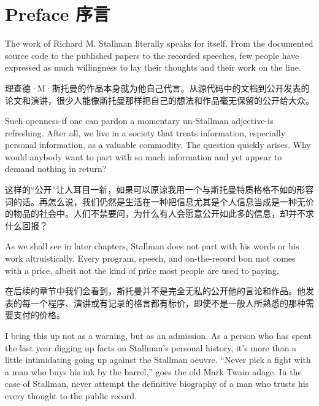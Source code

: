 \chapter{\ifdefined\eng
Preface
\fi
\ifdefined\chs
序言
\fi}

\ifdefined\eng
The work of Richard M. Stallman literally speaks for itself. From the documented source code to the published papers to the recorded speeches, few people have expressed as much willingness to lay their thoughts and their work on the line.
\fi

\ifdefined\chs
理查德·M·斯托曼的作品本身就为他自己代言。从源代码中的文档到公开发表的论文和演讲，很少人能像斯托曼那样把自己的想法和作品毫无保留的公开给大众。
\fi

\ifdefined\eng
Such openness-if one can pardon a momentary un-Stallman adjective-is refreshing. After all, we live in a society that treats information, especially personal information, as a valuable commodity. The question quickly arises. Why would anybody want to part with so much information and yet appear to demand nothing in return?
\fi

\ifdefined\chs
这样的``公开''让人耳目一新，如果可以原谅我用一个与斯托曼特质格格不如的形容词的话。再怎么说，我们仍然是生活在一种把信息尤其是个人信息当成是一种无价的物品的社会中。人们不禁要问，为什么有人会愿意公开如此多的信息，却并不求什么回报？
\fi

\ifdefined\eng
As we shall see in later chapters, Stallman does not part with his words or his work altruistically. Every program, speech, and on-the-record bon mot comes with a price, albeit not the kind of price most people are used to paying.
\fi

\ifdefined\chs
在后续的章节中我们会看到，斯托曼并不是完全无私的公开他的言论和作品。他发表的每一个程序、演讲或有记录的格言都有标价，即使不是一般人所熟悉的那种需要支付的价格。
\fi

\ifdefined\eng
I bring this up not as a warning, but as an admission. As a person who has spent the last year digging up facts on Stallman's personal history, it's more than a little intimidating going up against the Stallman oeuvre. ``Never pick a fight with a man who buys his ink by the barrel,'' goes the old Mark Twain adage. In the case of Stallman, never attempt the definitive biography of a man who trusts his every thought to the public record.
\fi

